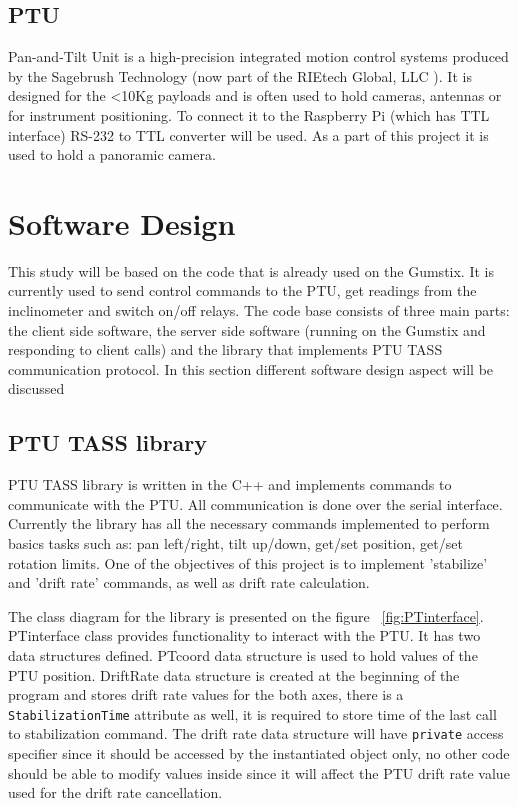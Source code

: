 \subsection{PTU}
Pan-and-Tilt Unit is a high-precision integrated motion control systems produced by the Sagebrush Technology (now part of the RIEtech Global, LLC \cite{RIEtech_Global}). It is designed for the <10Kg payloads and is often used to hold cameras, antennas or for instrument positioning. To connect it to the Raspberry Pi (which has TTL interface) RS-232 to TTL converter will be used. As a part of this project it is used to hold a panoramic camera. 

\section{Software Design}
This study will be based on the code that is already used on the Gumstix. It is currently used to send control commands to the PTU, get readings from the inclinometer and switch on/off relays. The code base consists of three main parts: the client side software, the server side software (running on the Gumstix and responding to client calls) and the library that implements PTU TASS communication protocol. In this section different software design aspect will be discussed

\subsection{PTU TASS library}
\label{PTUTASSlibrary}
PTU TASS library is written in the C++ and implements commands to communicate with the PTU. All communication is done over the serial interface. Currently the library has all the necessary commands implemented to perform basics tasks such as: pan left/right, tilt up/down, get/set position, get/set rotation limits. One of the objectives of this project is to implement 'stabilize' and 'drift rate' commands, as well as drift rate calculation. 

The class diagram for the library is presented on the figure ~\ref{fig:PTinterface}. PTinterface class provides functionality to interact with the PTU. It has two data structures defined. PTcoord data structure is used to hold values of the PTU position. DriftRate data structure is created at the beginning of the program and stores drift rate values for the both axes, there is a \texttt{StabilizationTime} attribute as well, it is required to store time of the last call to stabilization command. The drift rate data structure will have \texttt{private} access specifier since it should be accessed by the instantiated object only, no other code should be able to modify values inside since it will affect the PTU drift rate value used for the drift rate cancellation.

